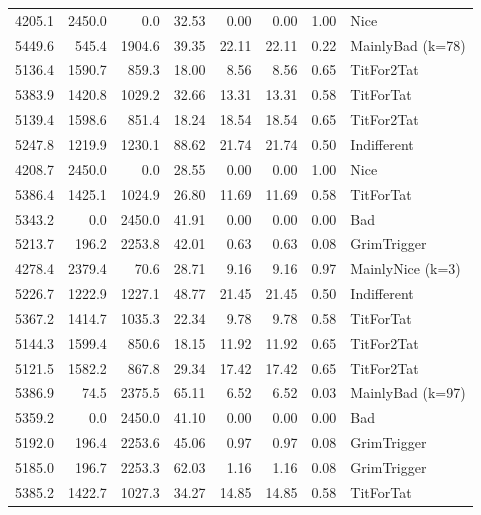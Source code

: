 \documentclass[journal,a4paper,10pt,twoside]{IEEEtran} %
\begin{document}
\begin{tabular}{rrrrrrrl}
    4205.1 &  2450.0 &     0.0 &  32.53 &   0.00 &   0.00 &  1.00 &               Nice \\
    5449.6 &   545.4 &  1904.6 &  39.35 &  22.11 &  22.11 &  0.22 &   MainlyBad (k=78) \\
    5136.4 &  1590.7 &   859.3 &  18.00 &   8.56 &   8.56 &  0.65 &         TitFor2Tat \\
    5383.9 &  1420.8 &  1029.2 &  32.66 &  13.31 &  13.31 &  0.58 &          TitForTat \\
    5139.4 &  1598.6 &   851.4 &  18.24 &  18.54 &  18.54 &  0.65 &         TitFor2Tat \\
    5247.8 &  1219.9 &  1230.1 &  88.62 &  21.74 &  21.74 &  0.50 &        Indifferent \\
    4208.7 &  2450.0 &     0.0 &  28.55 &   0.00 &   0.00 &  1.00 &               Nice \\
    5386.4 &  1425.1 &  1024.9 &  26.80 &  11.69 &  11.69 &  0.58 &          TitForTat \\
    5343.2 &     0.0 &  2450.0 &  41.91 &   0.00 &   0.00 &  0.00 &                Bad \\
    5213.7 &   196.2 &  2253.8 &  42.01 &   0.63 &   0.63 &  0.08 &        GrimTrigger \\
    4278.4 &  2379.4 &    70.6 &  28.71 &   9.16 &   9.16 &  0.97 &   MainlyNice (k=3) \\
    5226.7 &  1222.9 &  1227.1 &  48.77 &  21.45 &  21.45 &  0.50 &        Indifferent \\
    5367.2 &  1414.7 &  1035.3 &  22.34 &   9.78 &   9.78 &  0.58 &          TitForTat \\
    5144.3 &  1599.4 &   850.6 &  18.15 &  11.92 &  11.92 &  0.65 &         TitFor2Tat \\
    5121.5 &  1582.2 &   867.8 &  29.34 &  17.42 &  17.42 &  0.65 &         TitFor2Tat \\
    5386.9 &    74.5 &  2375.5 &  65.11 &   6.52 &   6.52 &  0.03 &   MainlyBad (k=97) \\
    5359.2 &     0.0 &  2450.0 &  41.10 &   0.00 &   0.00 &  0.00 &                Bad \\
    5192.0 &   196.4 &  2253.6 &  45.06 &   0.97 &   0.97 &  0.08 &        GrimTrigger \\
    5185.0 &   196.7 &  2253.3 &  62.03 &   1.16 &   1.16 &  0.08 &        GrimTrigger \\
    5385.2 &  1422.7 &  1027.3 &  34.27 &  14.85 &  14.85 &  0.58 &          TitForTat \\

\end{tabular}
\end{document}
